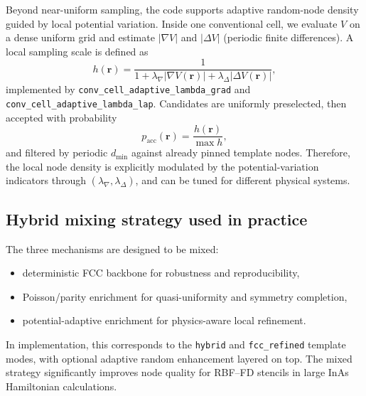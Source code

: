 Beyond near-uniform sampling, the code supports adaptive random-node density guided by local potential variation.
Inside one conventional cell, we evaluate $V$ on a dense uniform grid and estimate
$|\nabla V|$ and $|\Delta V|$ (periodic finite differences). A local sampling scale is defined as
\begin{equation}
 h(\mathbf{r}) = \frac{1}{1+\lambda_{\nabla}|\nabla V(\mathbf{r})|+\lambda_{\Delta}|\Delta V(\mathbf{r})|},
\end{equation}
implemented by \verb|conv_cell_adaptive_lambda_grad| and
\verb|conv_cell_adaptive_lambda_lap|.
Candidates are uniformly preselected, then accepted with probability
\begin{equation}
 p_{\mathrm{acc}}(\mathbf{r}) = \frac{h(\mathbf{r})}{\max h},
\end{equation}
and filtered by periodic $d_{\min}$ against already pinned template nodes.
Therefore, the local node density is explicitly modulated by the potential-variation indicators through $(\lambda_{\nabla},\lambda_{\Delta})$, and can be tuned for different physical systems.

\subsection{Hybrid mixing strategy used in practice}

The three mechanisms are designed to be mixed:
\begin{itemize}
  \item deterministic FCC backbone for robustness and reproducibility,
  \item Poisson/parity enrichment for quasi-uniformity and symmetry completion,
  \item potential-adaptive enrichment for physics-aware local refinement.
\end{itemize}
In implementation, this corresponds to the \verb|hybrid| and \verb|fcc_refined| template modes,
with optional adaptive random enhancement layered on top.
The mixed strategy significantly improves node quality for RBF--FD stencils in large InAs Hamiltonian calculations.
